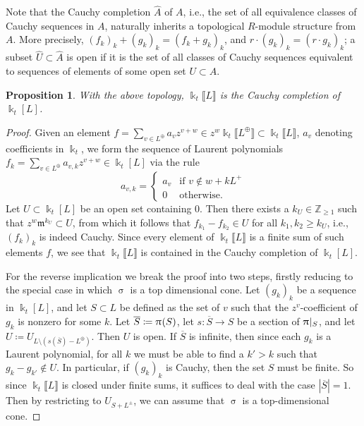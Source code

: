 \documentclass{amsart}
\let\?=\overline
\let\llb=\llbracket
\let\rrb=\rrbracket
\let\bb=\mathbb
\let\rar=\rightarrow
\let\wh=\widehat
\newcommand {\kk} {\Bbbk}
\newcommand {\kt} {\kk_t}
\renewcommand{\pi}{\uppi\hspace{0.05em}}
\renewcommand{\sigma}{\upsigma}
\theoremstyle{plain}%
\newtheorem{prop}[thm]{Proposition}
\theoremstyle{definition}
\theoremstyle{remark}
\begin{document}
Note that the Cauchy completion $\wh{A}$ of $A$, i.e., the set of all equivalence classes of Cauchy sequences in $A$, naturally inherits a topological $R$-module structure from $A$. More precisely, $(f_{k})_k+(g_k)_k=(f_k+g_k)_k$, and $r\cdot (g_k)_k=(r\cdot g_k)_k$; a subset $\wh{U}\subset \wh{A}$ is open if it is the set of all classes of Cauchy sequences equivalent to sequences of elements of some open set $U\subset A$.


\begin{prop}\label{CauchyProp}
With the above topology, $\kk_t\llb L\rrb$ is the Cauchy completion of $\kk_t[L]$.
\end{prop}
\begin{proof}
Given an element $f=\sum_{v\in L^{\oplus}}a_{v}z^{v+w}\in z^w\kk_t\llb L^{\oplus}\rrb\subset \kk_t\llb L\rrb$, $a_v$ denoting coefficients in $\kt$, we form the sequence of Laurent polynomials $f_k=\sum_{v\in L^{\oplus}}a_{v,k}z^{v+w}\in \kk_t[L]$ via the rule  
\[
a_{v,k}=\begin{cases} a_{v}&\textrm{if }v\notin w+ kL^+\\ 0 &\textrm{otherwise.}\end{cases}
\]
Let $U\subset \kk_t[L]$ be an open set containing 0.  Then there exists a $k_U\in \bb{Z}_{\geq 1}$ such that $z^{w}\mathfrak{m}^{k_U}\subset U$, from which it follows that $f_{k_1}-f_{k_2}\in U$ for all $k_1,k_2\geq k_U$, i.e., $(f_k)_k$ is indeed Cauchy.  Since every element of $\kk_t\llb L\rrb$ is a finite sum of such elements $f$, we see that $\kk_t\llb L\rrb$ is contained in the Cauchy completion of $\kk_t[L]$. 



For the reverse implication we break the proof into two steps, firstly reducing to the special case in which $\sigma$ is a top dimensional cone.  Let $(g_k)_k$ be a sequence in $\kk_t[L]$, and let $S\subset L$ be defined as the set of $v$ such that the $z^v$-coefficient of $g_k$ is nonzero for some $k$.  Let $\?{S}\coloneqq \pi(S)$, let $s\colon \?{S}\rar S$ be a section of $\pi|_S$, and let $U\coloneqq U_{L\setminus (s(\?{S})-L^{\oplus})}$.  Then $U$ is open.  If $\?{S}$ is infinite, then since each $g_k$ is a Laurent polynomial, for all $k$ we must be able to find a $k'>k$ such that 
$g_k-g_{k'}\not\in U$.  In particular, if $(g_k)_k$ is Cauchy, then the set $S$ must be finite.  So since $\kk_t\llb L\rrb$ is closed under finite sums, it suffices to deal with the case $|\?{S}|=1$.  Then by restricting to $U_{S+L^{\pm}}$, we can assume that $\sigma$ is a top-dimensional cone.




\end{proof}
\end{document}
